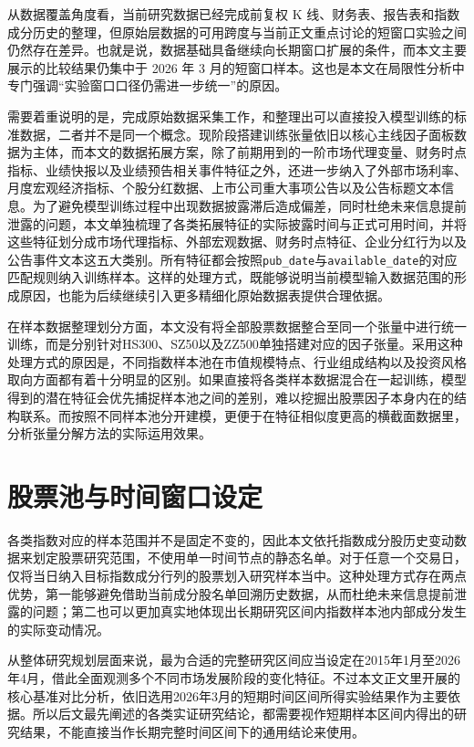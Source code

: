 从数据覆盖角度看，当前研究数据已经完成前复权 K 线、财务表、报告表和指数成分历史的整理，但原始层数据的可用跨度与当前正文重点讨论的短窗口实验之间仍然存在差异。也就是说，数据基础具备继续向长期窗口扩展的条件，而本文主要展示的比较结果仍集中于 2026 年 3 月的短窗口样本。这也是本文在局限性分析中专门强调“实验窗口口径仍需进一步统一”的原因。

需要着重说明的是，完成原始数据采集工作，和整理出可以直接投入模型训练的标准数据，二者并不是同一个概念。现阶段搭建训练张量依旧以核心主线因子面板数据为主体，而本文的数据拓展方案，除了前期用到的一阶市场代理变量、财务时点指标、业绩快报以及业绩预告相关事件特征之外，还进一步纳入了外部市场利率、月度宏观经济指标、个股分红数据、上市公司重大事项公告以及公告标题文本信息。为了避免模型训练过程中出现数据披露滞后造成偏差，同时杜绝未来信息提前泄露的问题，本文单独梳理了各类拓展特征的实际披露时间与正式可用时间，并将这些特征划分成市场代理指标、外部宏观数据、财务时点特征、企业分红行为以及公告事件文本这五大类别。所有特征都会按照\texttt{pub\_date}与\texttt{available\_date}的对应匹配规则纳入训练样本。这样的处理方式，既能够说明当前模型输入数据范围的形成原因，也能为后续继续引入更多精细化原始数据表提供合理依据。

在样本数据整理划分方面，本文没有将全部股票数据整合至同一个张量中进行统一训练，而是分别针对HS300、SZ50以及ZZ500单独搭建对应的因子张量。采用这种处理方式的原因是，不同指数样本池在市值规模特点、行业组成结构以及投资风格取向方面都有着十分明显的区别。如果直接将各类样本数据混合在一起训练，模型得到的潜在特征会优先捕捉样本池之间的差别，难以挖掘出股票因子本身内在的结构联系。而按照不同样本池分开建模，更便于在特征相似度更高的横截面数据里，分析张量分解方法的实际运用效果。

\section{股票池与时间窗口设定}

各类指数对应的样本范围并不是固定不变的，因此本文依托指数成分股历史变动数据来划定股票研究范围，不使用单一时间节点的静态名单。对于任意一个交易日，仅将当日纳入目标指数成分行列的股票划入研究样本当中。这种处理方式存在两点优势，第一能够避免借助当前成分股名单回溯历史数据，从而杜绝未来信息提前泄露的问题；第二也可以更加真实地体现出长期研究区间内指数样本池内部成分发生的实际变动情况。

从整体研究规划层面来说，最为合适的完整研究区间应当设定在2015年1月至2026年4月，借此全面观测多个不同市场发展阶段的变化特征。不过本文正文里开展的核心基准对比分析，依旧选用2026年3月的短期时间区间所得实验结果作为主要依据。所以后文最先阐述的各类实证研究结论，都需要视作短期样本区间内得出的研究结果，不能直接当作长期完整时间区间下的通用结论来使用。

